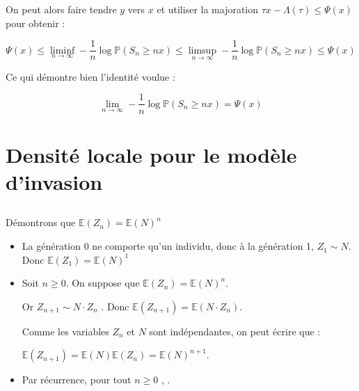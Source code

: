 \documentclass[12pt,titlepage=true]{article}
\newcommand{\esp}{\mathbb{E}}
\renewcommand{\P}{\mathbb{P}}
\begin{document}
			On peut alors faire tendre $y$ vers $x$ et utiliser la majoration $\tau x - \Lambda(\tau) \leqslant \Psi(x) $ pour obtenir : 
		
			\begin{equation*}
				\Psi(x) \leqslant \liminf_{n\rightarrow\infty}-\frac{1}{n} \log \P(S_n \geqslant nx) \leqslant 	\limsup_{n\to\infty}-\frac{1}{n} \log \P(S_n \geqslant nx) \leqslant \Psi(x) 
			\end{equation*}
		
			Ce qui démontre bien l'identité voulue :
		
			\begin{equation}
				\boxed{\lim_{n\to\infty}-\frac{1}{n} \log \P(S_n \geqslant nx) = \Psi(x)} \label{resQ4}
			\end{equation}
		
		\subsection{} %
		
	\section{Densité locale pour le modèle d'invasion}
		\subsection{} %
			
			\paragraph{} Démontrons que $\esp(Z_n)=\esp(N)^n$
			\begin{itemize}
			
				\item	La génération 0 ne comporte qu'un individu, donc à la génération 1, $Z_1\sim N$. Donc $\esp(Z_1)=\esp(N)^1$
				
				\item	Soit $n\geqslant 0$. On suppose que $\esp(Z_n)=\esp(N)^n$.
				
						Or $Z_{n+1}\sim N \cdotp Z_n$ . Donc $\esp(Z_{n+1}) = \esp(N \cdotp Z_n)$.
						
						Comme les variables $Z_n$ et $N$ sont indépendantes, on peut écrire que :
						
						$\esp(Z_{n+1}) = \esp(N) \esp( Z_n) = \esp(N)^{n+1}$.
				\item Par récurrence, pour tout $n\geqslant0 $ , \fbox{$\esp(Z_n)=\esp(N)^n$}.
				
			\end{itemize}
	
\end{document}
